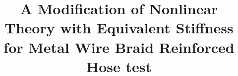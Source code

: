\title{A Modification of Nonlinear Theory with Equivalent Stiffness for Metal Wire Braid Reinforced Hose test}





